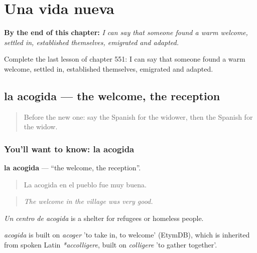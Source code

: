 
\chapter{Una vida nueva}
\label{ch:es-una-vida-nueva}

\begin{chapteropening}
\textbf{By the end of this chapter:} \emph{I can say that someone found a warm welcome, settled in, established themselves, emigrated and adapted.}

Complete the last lesson of chapter 551: I can say that someone found a warm welcome, settled in, established themselves, emigrated and adapted.
\end{chapteropening}

\section[la acogida]{la acogida — the welcome, the reception}

\label{lesson:ES-C551-acogida}



\begin{quote}
Before the new one: say the Spanish for the widower, then the Spanish for the widow.
\end{quote}

\subsection*{You'll want to know: la acogida}
\textbf{la acogida} — \textquotedblleft{}the welcome, the reception\textquotedblright{}.

\begin{quote}
La acogida en el pueblo fue muy buena.
\end{quote}

\begin{quote}
\emph{The welcome in the village was very good.}
\end{quote}

\emph{Un centro de acogida} is a shelter for refugees or homeless people.

\begin{cousinweb}
\emph{acogida} is built on \emph{acoger} 'to take in, to welcome' (EtymDB), which is inherited from spoken Latin \emph{*accolligere}, built on \emph{colligere} 'to gather together'.
\end{cousinweb}


